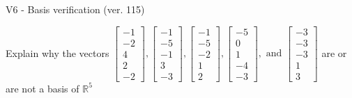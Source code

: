 \begin{exercise}
  \begin{exerciseTitle}V6 - Basis verification (ver. 115)\end{exerciseTitle}
  \begin{exerciseStatement}
    Explain why the vectors \(\left[\begin{array}{r}
-1 \\
-2 \\
4 \\
2 \\
-2
\end{array}\right] , \left[\begin{array}{r}
-1 \\
-5 \\
-1 \\
3 \\
-3
\end{array}\right] , \left[\begin{array}{r}
-1 \\
-5 \\
-2 \\
1 \\
2
\end{array}\right] , \left[\begin{array}{r}
-5 \\
0 \\
1 \\
-4 \\
-3
\end{array}\right] , \text{ and } \left[\begin{array}{r}
-3 \\
-3 \\
-3 \\
1 \\
3
\end{array}\right]\) are or are not a basis of \(\mathbb{R}^5\)	



\end{exerciseStatement}
\end{exercise}
